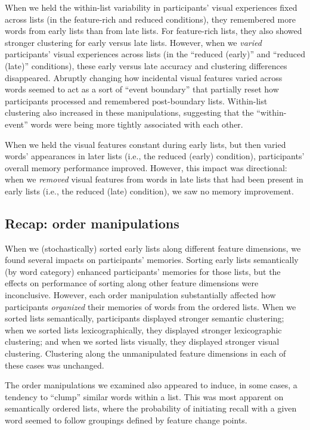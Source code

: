 \documentclass[11pt]{article}
\begin{document}
When we held the within-list variability in participants' visual experiences
fixed across lists (in the feature-rich and reduced conditions), they
remembered more words from early lists than from late lists. For feature-rich
lists, they also showed stronger clustering for early versus late lists.
However, when we \textit{varied} participants' visual experiences across lists
(in the ``reduced (early)'' and ``reduced (late)'' conditions), these early
versus late accuracy and clustering differences disappeared. Abruptly changing
how incidental visual features varied across words seemed to act as a sort of
``event boundary'' that partially reset how participants processed and
remembered post-boundary lists. Within-list clustering also increased in these
manipulations, suggesting that the ``within-event'' words were being more tightly
associated with each other.

When we held the visual features constant during early lists, but then varied
words' appearances in later lists (i.e., the reduced (early) condition),
participants' overall memory performance improved. However, this impact was
directional: when we \textit{removed} visual features from words in late lists
that had been present in early lists (i.e., the reduced (late) condition), we
saw no memory improvement.

\subsection*{Recap: order manipulations}

When we (stochastically) sorted early lists along different feature dimensions,
we found several impacts on participants' memories. Sorting early lists
semantically (by word category) enhanced participants' memories for those
lists, but the effects on performance of sorting along other feature dimensions
were inconclusive. However, each order manipulation substantially affected how
participants \textit{organized} their memories of words from the ordered lists.
When we sorted lists semantically, participants displayed stronger semantic
clustering; when we sorted lists lexicographically, they displayed stronger
lexicographic clustering; and when we sorted lists visually, they displayed
stronger visual clustering. Clustering along the unmanipulated feature
dimensions in each of these cases was unchanged.

The order manipulations we examined also appeared to induce, in some cases, a
tendency to ``clump'' similar words within a list. This was most apparent on
semantically ordered lists, where the probability of initiating recall with a
given word seemed to follow groupings defined by feature change points.
\end{document}
